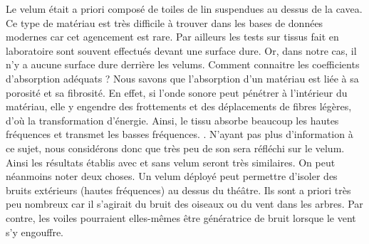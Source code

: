 Le \gls{velum} était a priori composé de toiles de lin \cite[p.38]{formige} suspendues au dessus de la \gls{cavea}. Ce type de matériau est très difficile à trouver dans les bases de données modernes car cet agencement est rare. Par ailleurs les tests sur tissus fait en laboratoire sont souvent effectués devant une surface dure. Or, dans notre cas, il n'y a aucune surface dure derrière les \glspl{velum}. Comment connaitre les coefficients d'absorption adéquats ? Nous savons que l'absorption d'un matériau est liée à sa porosité et sa fibrosité. En effet, si l'onde sonore peut pénétrer à l'intérieur du matériau, elle y engendre des frottements et des déplacements de fibres légères, d'où la transformation d'énergie. Ainsi, le tissu absorbe beaucoup les hautes fréquences et transmet les basses fréquences. \cite[Matériaux]{acouphile}. N'ayant pas plus d'information à ce sujet, nous considérons donc que très peu de son sera réfléchi sur le \gls{velum}. Ainsi les résultats établis avec et sans \gls{velum} seront très similaires. On peut néanmoins noter deux choses. Un \gls{velum} déployé peut permettre d'isoler des bruits extérieurs (hautes fréquences) au dessus du théâtre. Ils sont a priori très peu nombreux car il s'agirait du bruit des oiseaux ou du vent dans les arbres. Par contre, les voiles pourraient elles-mêmes être génératrice de bruit lorsque le vent s'y engouffre.


